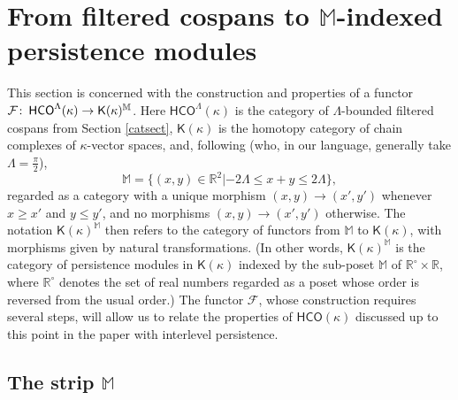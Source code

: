 \documentclass[11pt]{amsart}
\theoremstyle{definition}
\theoremstyle{remark}
\numberwithin{equation}{section}
\def\co{\colon\thinspace}
\def\R{\mathbb{R}}
\begin{document}
\section{From filtered cospans to $\mathbb{M}$-indexed persistence modules}\label{funsect}

This section is concerned with the construction and properties of a functor $\mathcal{F}\co \mathsf{HCO}^{\Lambda}(\kappa)\to \mathsf{K}(\kappa)^{\mathbb{M}}$. Here $\mathsf{HCO}^{\Lambda}(\kappa)$ is the category of  $\Lambda$-bounded filtered cospans from Section \ref{catsect}, $\mathsf{K}(\kappa)$ is the homotopy category of chain complexes of $\kappa$-vector spaces, and, following \cite{BBF20} (who, in our language, generally take $\Lambda=\frac{\pi}{2}$), \[ \mathbb{M}=\{(x,y)\in \R^2|-2\Lambda\leq x+y\leq 2\Lambda\},\] regarded as a category with a unique morphism $(x,y)\to (x',y')$ whenever $x\geq x'$ and $y\leq y'$, and no morphisms $(x,y)\to (x',y')$ otherwise. The notation $\mathsf{K}(\kappa)^{\mathbb{M}}$ then refers to the category of functors from $\mathbb{M}$ to $\mathsf{K}(\kappa)$, with morphisms given by natural transformations.  (In other words, $\mathsf{K}(\kappa)^{\mathbb{M}}$ is the category of persistence modules in $\mathsf{K}(\kappa)$ indexed by the sub-poset $\mathbb{M}$ of $\mathbb{R}^{\circ}\times \R$, where $\R^{\circ}$ denotes the set of real numbers regarded as a poset whose order is reversed from the usual order.)  The functor $\mathcal{F}$, whose construction requires several steps, will allow us to relate the properties of $\mathsf{HCO}(\kappa)$ discussed up to this point in the paper with interlevel persistence.

	
\subsection{The strip $\mathbb{M}$}\label{stripsect}
\end{document}
